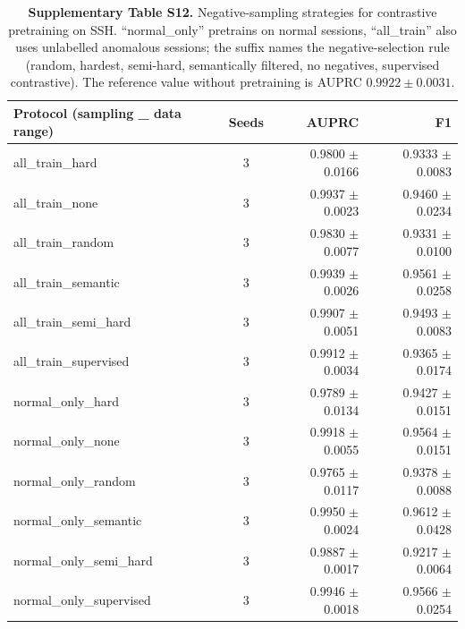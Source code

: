 \documentclass[11pt,a4paper]{article}
\begin{document}
\begin{table}[H]
\centering
\caption*{\textbf{Supplementary Table S12.} Negative-sampling strategies for contrastive pretraining on SSH. ``normal\_only'' pretrains on normal sessions, ``all\_train'' also uses unlabelled anomalous sessions; the suffix names the negative-selection rule (random, hardest, semi-hard, semantically filtered, no negatives, supervised contrastive). The reference value without pretraining is AUPRC $0.9922 \pm 0.0031$.}
{\small
\begin{tabular}{lcrr}
\toprule
Protocol (sampling \_ data range) & Seeds & AUPRC & F1 \\
\midrule
all\_train\_hard & 3 & 0.9800 $\pm$ 0.0166 & 0.9333 $\pm$ 0.0083 \\
all\_train\_none & 3 & 0.9937 $\pm$ 0.0023 & 0.9460 $\pm$ 0.0234 \\
all\_train\_random & 3 & 0.9830 $\pm$ 0.0077 & 0.9331 $\pm$ 0.0100 \\
all\_train\_semantic & 3 & 0.9939 $\pm$ 0.0026 & 0.9561 $\pm$ 0.0258 \\
all\_train\_semi\_hard & 3 & 0.9907 $\pm$ 0.0051 & 0.9493 $\pm$ 0.0083 \\
all\_train\_supervised & 3 & 0.9912 $\pm$ 0.0034 & 0.9365 $\pm$ 0.0174 \\
normal\_only\_hard & 3 & 0.9789 $\pm$ 0.0134 & 0.9427 $\pm$ 0.0151 \\
normal\_only\_none & 3 & 0.9918 $\pm$ 0.0055 & 0.9564 $\pm$ 0.0151 \\
normal\_only\_random & 3 & 0.9765 $\pm$ 0.0117 & 0.9378 $\pm$ 0.0088 \\
normal\_only\_semantic & 3 & 0.9950 $\pm$ 0.0024 & 0.9612 $\pm$ 0.0428 \\
normal\_only\_semi\_hard & 3 & 0.9887 $\pm$ 0.0017 & 0.9217 $\pm$ 0.0064 \\
normal\_only\_supervised & 3 & 0.9946 $\pm$ 0.0018 & 0.9566 $\pm$ 0.0254 \\
\bottomrule
\end{tabular}
}
\end{table}
\end{document}
